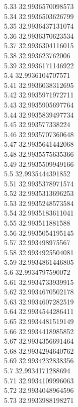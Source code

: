 {5.33	32.9936570098573\\
5.34	32.9936503626799\\
5.35	32.9936437131074\\
5.36	32.9936370623534\\
5.37	32.9936304116015\\
5.38	32.993623762006\\
5.39	32.9936171146922\\
5.4	32.9936104707571\\
5.41	32.9936038312695\\
5.42	32.9935971972711\\
5.43	32.9935905697764\\
5.44	32.9935839497734\\
5.45	32.993577338224\\
5.46	32.9935707360648\\
5.47	32.9935641442068\\
5.48	32.9935575635366\\
5.49	32.9935509949166\\
5.5	32.9935444391852\\
5.51	32.9935378971574\\
5.52	32.9935313696253\\
5.53	32.9935248573584\\
5.54	32.9935183611041\\
5.55	32.993511881588\\
5.56	32.9935054195145\\
5.57	32.993498975567\\
5.58	32.9934925504081\\
5.59	32.9934861446805\\
5.6	32.9934797590072\\
5.61	32.9934733939915\\
5.62	32.9934670502178\\
5.63	32.9934607282519\\
5.64	32.9934544286411\\
5.65	32.9934481519149\\
5.66	32.9934418985852\\
5.67	32.9934356691464\\
5.68	32.9934294640762\\
5.69	32.9934232838356\\
5.7	32.9934171288694\\
5.71	32.9934109996063\\
5.72	32.9934048964596\\
5.73	32.9933988198271\\
}
